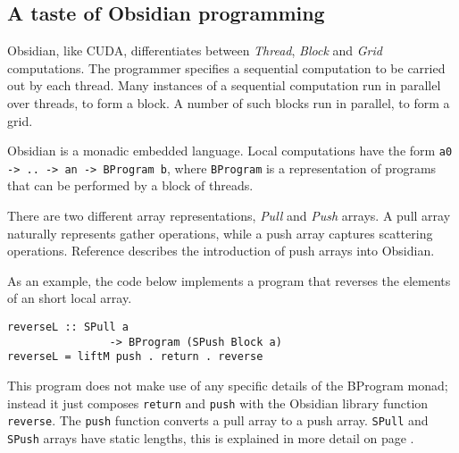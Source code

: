 
\subsection{A taste of Obsidian programming}

Obsidian, like CUDA, differentiates between {\em Thread}, {\em Block} and 
{\em Grid} computations. The programmer specifies a sequential computation 
to be carried out by each thread. Many instances of a sequential computation  
run in parallel over threads, to form a block. A number of such blocks run in 
parallel, to form a grid. 

Obsidian is a monadic embedded language. Local computations have the form 
{\tt a0 -> .. -> an -> BProgram b}, where {\tt BProgram}
is a representation of programs that can be performed by a block of threads.

There are two different array representations, {\em Pull} and 
{\em Push} arrays. A pull array naturally represents gather operations,
while a push array captures scattering operations. Reference  
describes the introduction of push arrays into Obsidian.  

As an example, the code below implements a program that reverses the elements 
of an short local array. 


\begin{small}
\begin{verbatim}
reverseL :: SPull a
                -> BProgram (SPush Block a)
reverseL = liftM push . return . reverse 
\end{verbatim} 
\end{small} 


This program does not make use of any specific details of the BProgram monad; 
instead it just composes {\tt return} and {\tt push} with the Obsidian library 
function {\tt reverse}. The {\tt push} function converts a pull array to a push 
array. {\tt SPull} and {\tt SPush} arrays have static lengths, this is explained in more 
detail on page \pageref{pag:HLSTATIC}.

